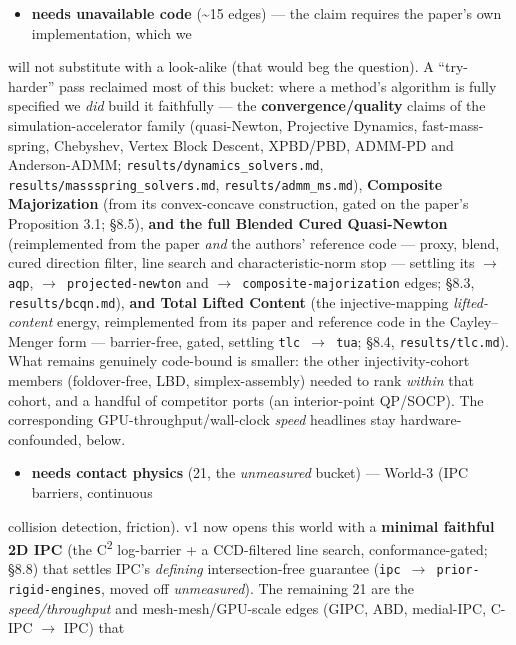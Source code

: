 \documentclass{egpubl}
\begin{document}
\begin{itemize}
  \item \textbf{needs unavailable code} (\textasciitilde{}15 edges) --- the claim requires the paper's own implementation, which we
\end{itemize}
  will not substitute with a look-alike (that would beg the question). A ``try-harder'' pass reclaimed
  most of this bucket: where a method's algorithm is fully specified we \emph{did} build it faithfully --- the
  \textbf{convergence/quality} claims of the simulation-accelerator family (quasi-Newton, Projective
  Dynamics, fast-mass-spring, Chebyshev, Vertex Block Descent, XPBD/PBD, ADMM-PD and Anderson-ADMM;
  \texttt{results/dynamics\_solvers.md}, \texttt{results/massspring\_solvers.md}, \texttt{results/admm\_ms.md}), \textbf{Composite
  Majorization} (from its convex-concave construction, gated on the paper's Proposition 3.1; \S8.5), \textbf{and
  the full Blended Cured Quasi-Newton} (reimplemented from the paper \emph{and} the authors' reference code ---
  proxy, blend, cured direction filter, line search and characteristic-norm stop --- settling its
  \texttt{$\rightarrow$ aqp}, \texttt{$\rightarrow$ projected-newton} and \texttt{$\rightarrow$ composite-majorization} edges; \S8.3, \texttt{results/bcqn.md}), \textbf{and
  Total Lifted Content} (the injective-mapping \emph{lifted-content} energy, reimplemented from its paper and
  reference code in the Cayley--Menger form --- barrier-free, gated, settling \texttt{tlc $\rightarrow$ tua}; \S8.4,
  \texttt{results/tlc.md}). What remains genuinely code-bound is smaller: the other injectivity-cohort members
  (foldover-free, LBD, simplex-assembly) needed to rank \emph{within} that cohort, and a handful of
  competitor ports (an interior-point QP/SOCP). The corresponding GPU-throughput/wall-clock \emph{speed}
  headlines stay hardware-confounded, below.
\begin{itemize}
  \item \textbf{needs contact physics} (21, the \emph{unmeasured} bucket) --- World-3 (IPC barriers, continuous
\end{itemize}
  collision detection, friction). v1 now opens this world with a \textbf{minimal faithful 2D IPC} (the C\textsuperscript{2}
  log-barrier + a CCD-filtered line search, conformance-gated; \S8.8) that settles IPC's \emph{defining}
  intersection-free guarantee (\texttt{ipc $\rightarrow$ prior-rigid-engines}, moved off \emph{unmeasured}). The remaining 21
  are the \emph{speed/throughput} and mesh-mesh/GPU-scale edges (GIPC, ABD, medial-IPC, C-IPC $\rightarrow$ IPC) that
\end{document}
